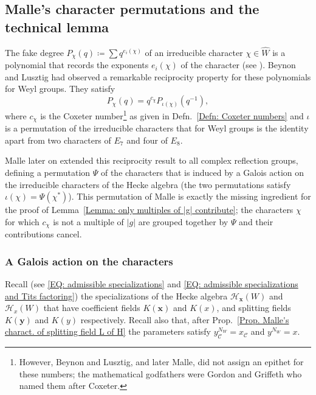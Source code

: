 \subsection{Malle's character permutations and the technical lemma}
\label{Section: Malle's character permutations and the technical lemma}

The fake degree $P_{\chi}(q)\coloneqq \sum q^{e_i(\chi)}$ of an irreducible character $\chi\in\widehat{W}$ is a polynomial that records the exponents $e_i(\chi)$ of the character (see \cite[\S4.4]{lehrer-taylor-book}). Beynon and Lusztig \cite[Prop.~A]{beynon-lustzig-coxeter-numbers-genesis} had observed a remarkable reciprocity property for these polynomials for Weyl groups. They satisfy $$P_{\chi}(q)=q^{c_{\chi}}P_{\iota(\chi)}(q^{-1}),$$where $c_{\chi}$ is the Coxeter number\footnote{However, Beynon and Lusztig, and later Malle, did not assign an epithet for these numbers; the mathematical godfathers were Gordon and Griffeth \cite{gordon-griffeth-catalan-numbers} who named them after Coxeter.} as given in Defn.~\ref{Defn: Coxeter numbers} and $\iota$ is a permutation of the irreducible characters that for Weyl groups is the identity apart from two characters of $E_7$ and four of $E_8$. 

Malle later on \cite[Thm.~6.5]{malle-fake-degrees} extended this reciprocity result to all complex reflection groups, defining a permutation $\Psi$ of the characters that is induced by a Galois action on the irreducible characters of the Hecke algebra (the two permutations satisfy $\iota(\chi)=\Psi(\chi^*)$). This permutation of Malle  is exactly the missing ingredient for the proof of Lemma~\ref{Lemma: only multiples of |g| contribute}; the characters $\chi$ for which $c_{\chi}$ is not a multiple of $|g|$ are grouped together by $\Psi$ and their contributions cancel.

\subsubsection*{A Galois action on the characters}

Recall (see \eqref{EQ: admissible specializations} and \eqref{EQ: admissible specializations and Tits factoring}) the specializations of the Hecke algebra $\mathcal{H}_{\bm x}(W)$ and $\mathcal{H}_x(W)$ that have coefficient fields $K(\bm x)$ and $K(x)$, and splitting fields $K(\bm y)$ and $K(y)$ respectively. Recall also that, after Prop.~\ref{Prop. Malle's charact. of splitting field L of H} the parameters satisfy $y_{\mathcal{C}}^{N_W}=x_{\mathcal{C}}$ and $y^{N_W}=x$.

